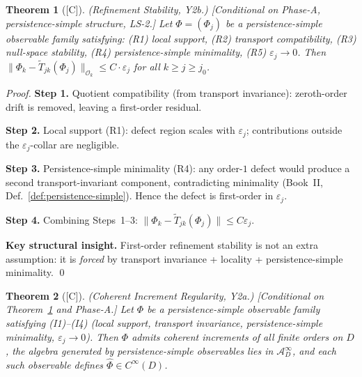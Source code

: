 \documentclass[12pt,oneside]{amsbook}
\theoremstyle{plain}
\newtheorem{theorem}{Theorem}[section]
\theoremstyle{definition}
\theoremstyle{remark}
\newcommand{\status}[1]{\textup{[#1]}}
\begin{document}
\begin{theorem}[\status{C}]\label{thm:refinement-stability}
\textup{(Refinement Stability, Y2b.)}
\textup{[Conditional on Phase-A, persistence-simple structure, LS-2.]}
Let $\Phi = (\Phi_j)$ be a persistence-simple observable family
satisfying: (R1) local support, (R2) transport compatibility,
(R3) null-space stability, (R4) persistence-simple minimality,
(R5) $\varepsilon_j \to 0$.  Then
$\|\Phi_k - \widetilde{T}_{jk}(\Phi_j)\|_{\mathcal{O}_k}
\leq C \cdot \varepsilon_j$ for all $k \geq j \geq j_0$.
\end{theorem}

\begin{proof}
\textbf{Step 1.}  Quotient compatibility (from transport invariance):
zeroth-order drift is removed, leaving a first-order residual.

\textbf{Step 2.}  Local support (R1): defect region scales with
$\varepsilon_j$; contributions outside the $\varepsilon_j$-collar
are negligible.

\textbf{Step 3.}  Persistence-simple minimality (R4): any order-$1$
defect would produce a second transport-invariant component,
contradicting minimality (Book~II,
Def.~\ref{def:persistence-simple}).  Hence the defect is first-order
in $\varepsilon_j$.

\textbf{Step 4.}  Combining Steps~1--3:
$\|\Phi_k - \widetilde{T}_{jk}(\Phi_j)\| \leq C\varepsilon_j$.

\textbf{Key structural insight.}  First-order refinement stability is
not an extra assumption: it is \emph{forced} by transport invariance +
locality + persistence-simple minimality. \qed
\end{proof}

\begin{theorem}[\status{C}]\label{thm:coherent-increment-regularity}
\textup{(Coherent Increment Regularity, Y2a.)}
\textup{[Conditional on Theorem~\ref{thm:refinement-stability} and
Phase-A.]}
Let $\Phi$ be a persistence-simple observable family satisfying
(I1)--(I4) (local support, transport invariance, persistence-simple
minimality, $\varepsilon_j \to 0$).  Then $\Phi$ admits coherent
increments of all finite orders on $D$, the algebra generated by
persistence-simple observables lies in $\mathcal{A}_D^\infty$, and
each such observable defines $\hat{\Phi} \in C^\infty(D)$.
\end{theorem}
\end{document}
